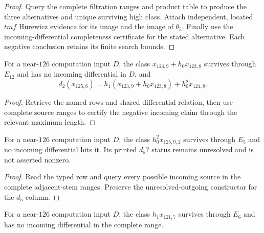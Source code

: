 \begin{proof}
  Query the complete filtration ranges and product table to produce the three
  alternatives and unique surviving high class.  Attach independent, located
  $tmf$ Hurewicz evidence for its image and the image of $\theta_5$.  Finally
  use the incoming-differential completeness certificate for the stated
  alternative.  Each negative conclusion retains its finite search bounds.
\end{proof}

\begin{proposition}
  \label{evidence:x1239}
  \notready
  For a near-$126$ computation input $D$, the class
  $x_{123,9}+h_0x_{123,8}$ survives through $E_{12}$ and has no incoming
  differential in $D$, and
  \[
    d_2(x_{125,8})=
      h_1(x_{123,9}+h_0x_{123,8})+h_0^2x_{124,8}.
  \]
\end{proposition}

\begin{proof}
  Retrieve the named rows and shared differential relation, then use complete
  source ranges to certify the negative incoming claim through the relevant
  maximum length.
\end{proof}

\begin{proposition}[$h_0^2x_{125,9,2}$ evidence]
  \label{evidence:h02x1259}
  \notready
  For a near-$126$ computation input $D$, the class $h_0^2x_{125,9,2}$
  survives through $E_5$ and no incoming
  differential hits it.  Its printed $d_5?$ status remains unresolved and is
  not asserted nonzero.
\end{proposition}

\begin{proof}
  Read the typed row and query every possible incoming source in the complete
  adjacent-stem ranges.  Preserve the unresolved-outgoing constructor for the
  $d_5$ column.
\end{proof}

\begin{proposition}[$h_1x_{121,7}$ evidence]
  \label{evidence:h1x1217}
  \notready
  For a near-$126$ computation input $D$, the class $h_1x_{121,7}$ survives
  through $E_6$ and has no incoming
  differential in the complete range.
\end{proposition}

